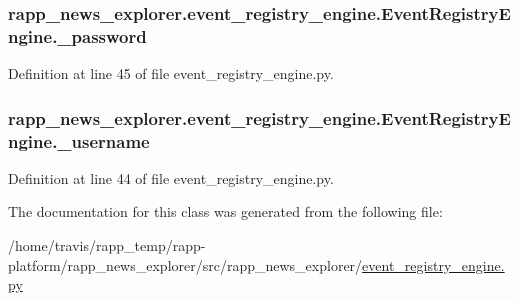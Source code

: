 \hypertarget{classrapp__news__explorer_1_1event__registry__engine_1_1EventRegistryEngine_a6188aa88f78a9ff6840dcba0c63c19d2}{
\subsubsection[{\-\_\-password}]{\setlength{\rightskip}{0pt plus 5cm}rapp\-\_\-news\-\_\-explorer.\-event\-\_\-registry\-\_\-engine.\-Event\-Registry\-Engine.\-\_\-password\hspace{0.3cm}{\ttfamily [private]}}}\label{classrapp__news__explorer_1_1event__registry__engine_1_1EventRegistryEngine_a6188aa88f78a9ff6840dcba0c63c19d2}


Definition at line 45 of file event\-\_\-registry\-\_\-engine.\-py.

\hypertarget{classrapp__news__explorer_1_1event__registry__engine_1_1EventRegistryEngine_a380d71c657027d3e1d573f5756c3b463}{
\subsubsection[{\-\_\-username}]{\setlength{\rightskip}{0pt plus 5cm}rapp\-\_\-news\-\_\-explorer.\-event\-\_\-registry\-\_\-engine.\-Event\-Registry\-Engine.\-\_\-username\hspace{0.3cm}{\ttfamily [private]}}}\label{classrapp__news__explorer_1_1event__registry__engine_1_1EventRegistryEngine_a380d71c657027d3e1d573f5756c3b463}


Definition at line 44 of file event\-\_\-registry\-\_\-engine.\-py.



The documentation for this class was generated from the following file\-:\begin{DoxyCompactItemize}
\item 
/home/travis/rapp\-\_\-temp/rapp-\/platform/rapp\-\_\-news\-\_\-explorer/src/rapp\-\_\-news\-\_\-explorer/\hyperlink{event__registry__engine_8py}{event\-\_\-registry\-\_\-engine.\-py}\end{DoxyCompactItemize}
